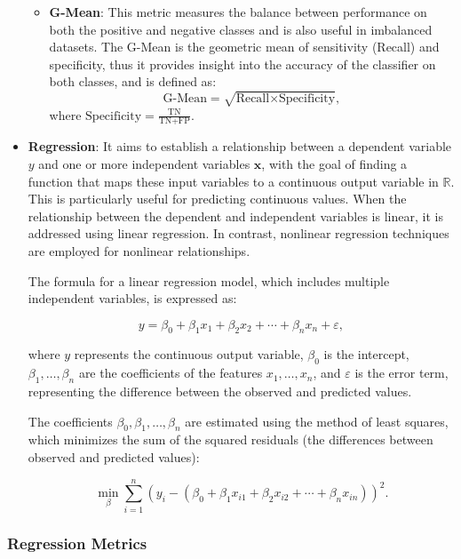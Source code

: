 \documentclass[12pt]{book}
\begin{document}
\begin{itemize}
\begin{itemize}
        \item \textbf{G-Mean}: This metric measures the balance between performance on both the positive and negative classes and is also useful in imbalanced datasets. The G-Mean is the geometric mean of sensitivity (Recall) and specificity, thus it provides insight into the accuracy of the classifier on both classes, and is defined as:
        \[
        \text{G-Mean} = \sqrt{\text{Recall} \times \text{Specificity}},
        \]
        where $\text{Specificity} = \frac{\text{TN}}{\text{TN} + \text{FP}}$.
    \end{itemize}


    \item \textbf{Regression}: It aims to establish a relationship between a dependent variable $y$ and one or more independent variables $\mathbf{x}$, with the goal of finding a function that maps these input variables to a continuous output variable in $\mathbb{R}$. This is particularly useful for predicting continuous values. When the relationship between the dependent and independent variables is linear, it is addressed using linear regression. In contrast, nonlinear regression techniques are employed for nonlinear relationships.
    
    The formula for a linear regression model, which includes multiple independent variables, is expressed as:
        
    \[
    y = \beta_0 + \beta_1 x_1 + \beta_2 x_2 + \cdots + \beta_n x_n + \varepsilon,
    \]
        
    where $y$ represents the continuous output variable, $\beta_0$ is the intercept, $\beta_1, \ldots, \beta_n$ are the coefficients of the features $x_1, \ldots, x_n$, and $\varepsilon$ is the error term, representing the difference between the observed and predicted values.

        
        
    The coefficients $\beta_0, \beta_1, \ldots, \beta_n$ are estimated using the method of least squares, which minimizes the sum of the squared residuals (the differences between observed and predicted values):
            
    \[
    \min_{\beta} \sum_{i=1}^n (y_i - (\beta_0 + \beta_1 x_{i1} + \beta_2 x_{i2} + \cdots + \beta_n x_{in}))^2.
    \]

\end{itemize}
    


\subsubsection{Regression Metrics}
\end{document}
